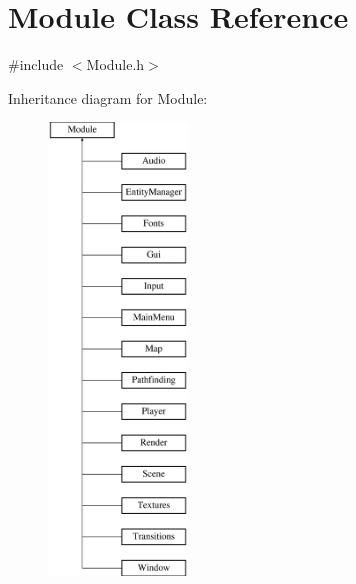 \hypertarget{class_module}{}\section{Module Class Reference}
\label{class_module}


{\ttfamily \#include $<$Module.\+h$>$}

Inheritance diagram for Module\+:\begin{figure}[H]
\begin{center}
\leavevmode
\includegraphics[height=12.000000cm]{class_module}
\end{center}
\end{figure}
